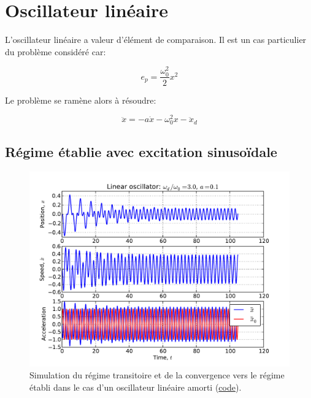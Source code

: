 \documentclass[a4paper,11pt,twoside]{article}
\begin{document}
\section{Oscillateur linéaire}

L'oscillateur linéaire a valeur d'élément de comparaison. Il est un cas particulier du problème considéré car:

\begin{equation}
e_p = \frac{\omega_0^2}{2} x^2
\end{equation}

Le problème se ramène alors à résoudre:

\begin{equation}
\ddot{x} = -a \dot{x} - \omega_0^2 x - \ddot{x}_d
\end{equation}

\subsection{Régime établie avec excitation sinusoïdale}

\begin{figure}
\begin{center}
\includegraphics[width = 1.\textwidth]{../oscillators/example_code/linear_oscillator_signal.pdf}
\end{center}
\caption{Simulation du régime transitoire et de la convergence vers le régime établi dans le cas d'un oscillateur linéaire amorti (\href{https://github.com/lcharleux/oscillators/blob/master/oscillators/example_code/linear_oscillator_demo.py}{code}).}
\label{fig:linear_oscillator_power}
\end{figure}
\end{document}
